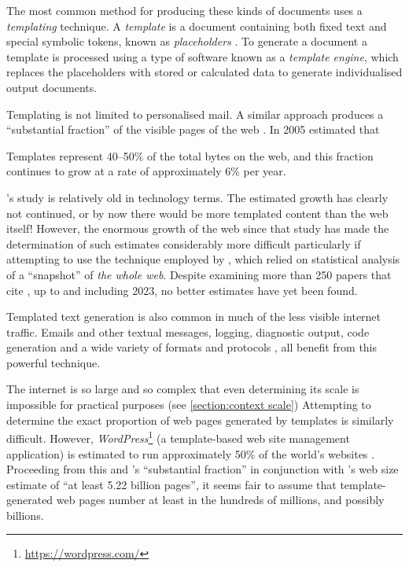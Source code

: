 The most common method for producing these kinds of documents uses a \emph{templating} technique. A \emph{template} is a document containing both fixed text and special symbolic tokens, known as \emph{placeholders} \citep{Arnoldus2007}. To generate a document a template is processed using a type of software known as a \emph{\gls{template engine}}, which replaces the placeholders with stored or calculated data to generate individualised output documents.

Templating is not limited to personalised mail. A similar approach produces a \enquote{substantial fraction} of the visible pages of the web \citep{Yang2008}. In 2005 \citeauthor{Gibson2005} estimated that

\begin{displayquote}
Templates represent 40–50\% of the total bytes on the web, and this fraction continues to grow at a rate of approximately 6\% per year.
\end{displayquote}

\citeauthor{Gibson2005}'s study is relatively old in technology terms. The estimated growth has clearly not continued, or by now there would be more templated content than the web itself! However, the enormous growth of the web since that study has made the determination of such estimates considerably more difficult particularly if attempting to use the technique employed by \citeauthor{Gibson2005}, which relied on statistical analysis of a \enquote{snapshot} of \emph{the whole web}. Despite examining more than 250 papers that cite \citeauthor{Gibson2005}, up to and including 2023, no better estimates have yet been found.

Templated text generation is also common in much of the less visible internet traffic. Emails and other textual messages, logging, diagnostic output, code generation \citep{Fritzson2009} \citep{Arnoldus2010} and a wide variety of formats and protocols \citep{Barbosa2002}, all benefit from this powerful technique.

\label{A110}
The internet is so large and so complex that even determining its scale is impossible for practical purposes (see \autoref{section:context scale}) Attempting to determine the exact proportion of web pages generated by templates is similarly difficult. However, \emph{WordPress}\footnote{\url{https://wordpress.com/}} (a template-based web site management application) is estimated to run approximately 50\% of the world's websites \citep{W3Techs2022b}. Proceeding from this and \citeauthor{Yang2008}'s \enquote{substantial fraction} in conjunction with \citet{Kunder2008}'s web size estimate of \enquote{at least 5.22 billion pages}, it seems fair to assume that template-generated web pages number at least in the hundreds of millions, and possibly billions.

